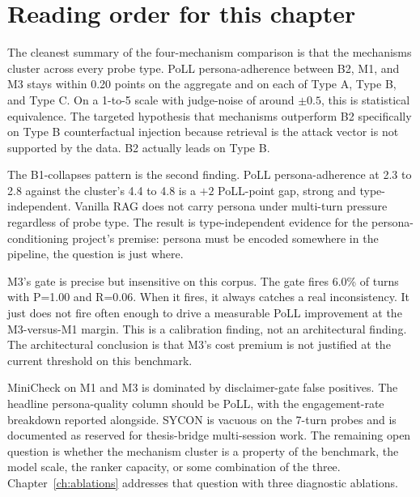 \section{Reading order for this chapter}

The cleanest summary of the four-mechanism comparison is that the mechanisms cluster across every probe type. PoLL persona-adherence between B2, M1, and M3 stays within 0.20 points on the aggregate and on each of Type A, Type B, and Type C. On a 1-to-5 scale with judge-noise of around $\pm 0.5$, this is statistical equivalence. The targeted hypothesis that mechanisms outperform B2 specifically on Type B counterfactual injection because retrieval is the attack vector is not supported by the data. B2 actually leads on Type B.

The B1-collapses pattern is the second finding. PoLL persona-adherence at 2.3 to 2.8 against the cluster's 4.4 to 4.8 is a $+2$ PoLL-point gap, strong and type-independent. Vanilla RAG does not carry persona under multi-turn pressure regardless of probe type. The result is type-independent evidence for the persona-conditioning project's premise: persona must be encoded somewhere in the pipeline, the question is just where.

M3's gate is precise but insensitive on this corpus. The gate fires 6.0\% of turns with P=1.00 and R=0.06. When it fires, it always catches a real inconsistency. It just does not fire often enough to drive a measurable PoLL improvement at the M3-versus-M1 margin. This is a calibration finding, not an architectural finding. The architectural conclusion is that M3's cost premium is not justified at the current threshold on this benchmark.

MiniCheck on M1 and M3 is dominated by disclaimer-gate false positives. The headline persona-quality column should be PoLL, with the engagement-rate breakdown reported alongside. SYCON is vacuous on the 7-turn probes and is documented as reserved for thesis-bridge multi-session work. The remaining open question is whether the mechanism cluster is a property of the benchmark, the model scale, the ranker capacity, or some combination of the three. Chapter~\ref{ch:ablations} addresses that question with three diagnostic ablations.
